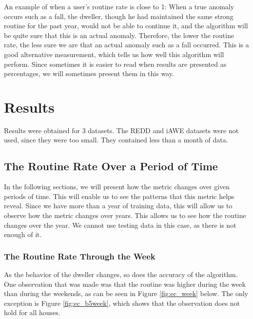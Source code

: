 An example of when a user's routine rate is close to 1: When a true anomaly occurs such as a fall, the dweller, though he had maintained the same strong routine for the past year, would not be able to continue it, and the algorithm will be quite sure that this is an actual anomaly.
Therefore, the lower the routine rate, the less sure we are that an actual anomaly such as a fall occurred.
This is a good alternative measurement, which tells us how well this algorithm will perform. 
Since sometimes it is easier to read when results are presented as percentages, we will sometimes present them in this way.
 
\section{Results} 

Results were obtained for 3 datasets. 
The REDD and iAWE datasets were not used, since they were too small. 
They contained less than a month of data. 

\subsection{The Routine Rate Over a Period of Time}

In the following sections, we will present how the metric changes over given periods of time.
This will enable us to see the patterns that this metric helps reveal. 
Since we have more than a year of training data, this will allow us to observe how the metric changes over years.
This allows us to see how the routine changes over the year. 
We cannot use testing data in this case, as there is not enough of it.

\subsubsection{The Routine Rate Through the Week} \label{sssec:ratio_week}

As the behavior of the dweller changes, so does the accuracy of the algorithm. 
One observation that was made was that the routine was higher during the week than during the weekends,
as can be seen in Figure \ref{fig:ec_week} below. 
The only exception is Figure \ref{fig:ec_b5week}, which shows that the observation does not hold for all houses. 

